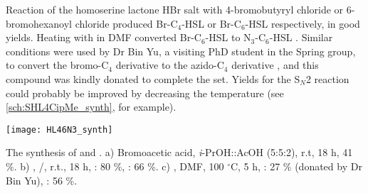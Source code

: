 Reaction of the homoserine lactone HBr salt  with 4-bromobutyryl chloride  or 6-bromohexanoyl chloride  produced Br-C$_4$-HSL  or Br-C$_6$-HSL  respectively, in good yields. Heating with  in DMF converted Br-C$_6$-HSL  to N$_3$-C$_6$-HSL . 
Similar conditions were used by Dr Bin Yu, a visiting PhD student in the Spring group, to convert the bromo-C$_4$ derivative  to the azido-C$_4$ derivative , and this compound was kindly donated to complete the set. 
Yields for the S$_N$2 reaction could probably be improved by decreasing the temperature (see \ref{sch:SHL4CipMe_synth}, for example).

\begin{scheme}[H]
	\begin{center}
		\texttt{[image: HL46N3\_synth]}
		\caption{The synthesis of  and .
		a) Bromoacetic acid, \textit{i}-PrOH::AcOH (5:5:2), r.t, 18 h, 41 \%.
		b) , /, r.t., 18 h, : 80 \%, : 66 \%.
		c) , DMF, 100 $^{\circ}$C, 5 h, : 27 \% (donated by Dr Bin Yu), : 56 \%.
		\label{sch:HL46N3_synth}}
	\end{center}
\end{scheme}
